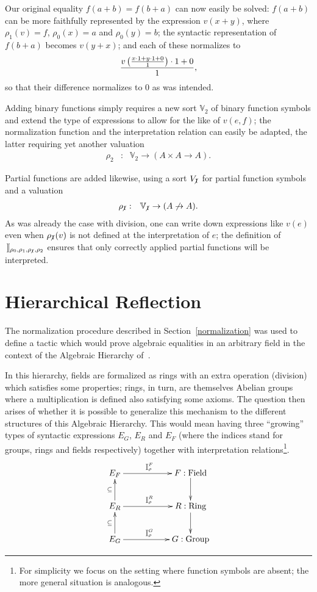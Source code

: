 \documentclass[runningheads]{llncs}
\newcommand{\pidx}{_{\!\not\,1}}
\newcommand{\intII}{\,]\![}
\newcommand{\intrelG}{\mathbin{\intII_\rho^G}}
\newcommand{\intrelF}{\mathbin{\intII_\rho^F}}
\newcommand{\intrelR}{\mathbin{\intII_\rho^R}}
\newcommand{\intrelfour}{\mathbin{\intII_{\rho_0,\rho_1,\rho\pidx,\rho_2}}}
\newcommand{\V}{{\mathbb V}}
\begin{document}
\noindent Our original equality $f(a+b)=f(b+a)$ can now easily be
solved: $f(a+b)$ can be more faithfully represented by the
expression $v(x+y)$, where $\rho_1(v)=f$, $\rho_0(x)=a$ and
$\rho_0(y)=b$; the syntactic representation of $f(b+a)$ becomes
$v(y+x)$; and each of these normalizes to
$${v\left({x\cdot1+y\cdot1+0\over 1}\right)\cdot1+0\over 1},$$ so that
their difference normalizes to $0$ as was intended.

Adding binary functions simply requires a new sort $\V_2$ of binary
function symbols and extend the type of expressions to allow for the
like of $v(e,f)$; the normalization function and the interpretation relation
can easily be adapted, the latter requiring yet another valuation
\begin{eqnarray*}
\rho_2 & : & \V_2\to(A\times A\to A).
\end{eqnarray*}

\noindent Partial functions are added likewise, using a sort $V\pidx$
for partial function symbols and a valuation
\begin{eqnarray*}
\rho\pidx & : & \V\pidx\to(A\not\to A).
\end{eqnarray*}
\noindent As was already the case with division, one can write down
expressions like $v(e)$ even when $\rho\pidx(v)$ is not defined at
the interpretation of $e$; the definition of $\intrelfour$ ensures that
only correctly applied partial functions will be interpreted.

\section{Hierarchical Reflection}\label{hierarchical} %

The normalization procedure described in Section~\ref{normalization}
was used to define a tactic which would prove algebraic equalities in an
arbitrary field in the context of the Algebraic Hierarchy
of~\cite{geu:pol:wie:zwa:02}.

In this hierarchy, fields are formalized as rings with an extra operation
(division) which satisfies some properties; rings, in turn, are themselves
Abelian groups where a multiplication is defined also satisfying some
axioms.
The question then arises of whether it is possible to generalize this
mechanism to the different structures of this Algebraic Hierarchy.
This would mean having three ``growing'' types of syntactic
expressions $E_G$, $E_R$ and $E_F$ (where the indices stand for
groups, rings and fields respectively) together with interpretation
relations\footnote{For simplicity we focus on the setting where
function symbols are absent; the more general situation is analogous.}.
\[
\xymatrix{
E_F \ar[rr]^(.45){\intrelF} & & F : \mbox{Field}\ar[d] \\
E_R \ar[u]^{\subseteq}\ar[rr]^(.45){\intrelR} & & R : \mbox{Ring}\ar[d] \\
E_G \ar[u]^{\subseteq}\ar[rr]^(.45){\intrelG} & & G : \mbox{Group} \\
}
\]
\end{document}
